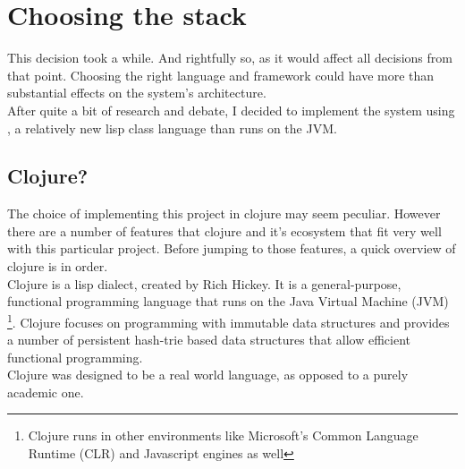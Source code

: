 
\chapter{Choosing the stack} %

\label{ch:stack} %

This decision took a while. And rightfully so, as it would affect all decisions from that point. Choosing the right language and framework could have more than substantial effects on the system's architecture.\\

After quite a bit of research and debate, I decided to implement the system using , a relatively new lisp class language than runs on the JVM.

\section{Clojure?}

The choice of implementing this project in clojure may seem peculiar. However there are a number of features that clojure and it's ecosystem that fit very well with this particular project. Before jumping to those features, a quick overview of clojure is in order.\\

Clojure is a lisp dialect, created by Rich Hickey. It is a general-purpose, functional programming language that runs on the Java Virtual Machine (JVM) \footnote{Clojure runs in other environments like Microsoft's Common Language Runtime (CLR) and Javascript engines as well}. Clojure focuses on programming with immutable data structures and provides a number of persistent hash-trie based data structures that allow efficient functional programming.\\

Clojure was designed to be a real world language, as opposed to a purely academic one.
